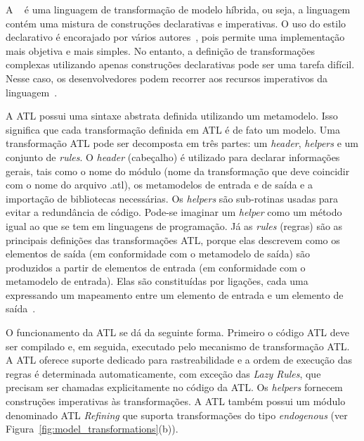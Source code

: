 A ~\cite{ATL_eclipse} é uma linguagem de transformação de modelo híbrida, ou seja, a linguagem contém uma mistura de construções declarativas e imperativas. O uso do estilo declarativo é encorajado por vários autores~\cite{Allilaire_06, Jouault_2005, Jouault_2008}, pois permite uma implementação mais objetiva e mais simples. No entanto, a definição de transformações complexas utilizando apenas construções declarativas pode ser uma tarefa difícil. Nesse caso, os desenvolvedores podem recorrer aos recursos imperativos da linguagem~\cite{Allilaire_06}.

A ATL possui uma sintaxe abstrata definida utilizando um metamodelo. Isso significa que cada transformação definida em ATL é de fato um modelo. Uma transformação ATL pode ser decomposta em três partes: um \textit{header}, \textit{helpers} e um conjunto de \textit{rules}. O \textit{header} (cabeçalho) é utilizado para declarar informações gerais, tais como o nome do módulo (nome da transformação que deve coincidir com o nome do arquivo .atl), os metamodelos de entrada e de saída  e a importação de bibliotecas necessárias. Os \textit{helpers} são sub-rotinas usadas para evitar a redundância de código. Pode-se imaginar um \textit{helper} como um método igual ao que se tem em linguagens de programação. Já as \textit{rules} (regras) são as principais definições das transformações ATL, porque elas descrevem como os elementos de saída (em conformidade com o metamodelo de saída) são produzidos a partir de elementos de entrada (em conformidade com o metamodelo de entrada). Elas são constituídas por ligações, cada uma expressando um mapeamento entre um elemento de entrada e um elemento de saída~\cite{ATL_eclipse}.

O funcionamento da ATL se dá da seguinte forma. Primeiro o código ATL deve ser compilado e, em seguida, executado pelo mecanismo de transformação ATL. A ATL oferece suporte dedicado para rastreabilidade e a ordem de execução das regras é determinada automaticamente, com exceção das \textit{Lazy Rules}, que precisam ser chamadas explicitamente no código da ATL. Os \textit{helpers} fornecem construções imperativas às transformações. A ATL também possui um módulo denominado ATL \textit{Refining} que suporta transformações do tipo \emph{endogenous}  (ver Figura~\ref{fig:model_transformations}(b)).

